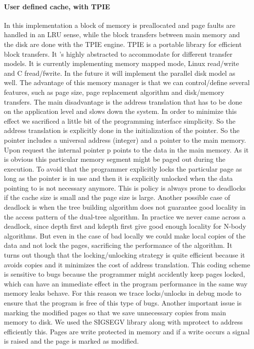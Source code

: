 \documentclass[12pt,letterpaper,doublespaced,ETD,dvips,proposal]{gtthesis}
\begin{document}
\begin{Body}
\paragraph{User defined cache, with TPIE} In this implementation a block of
memory is preallocated and page faults are handled in an LRU sense,
while the block transfers between main memory and the disk are done
with the TPIE engine. TPIE is a portable library for efficient block
transfers. It 's highly abstracted to accommodate for different
transfer models. It is currently implementing memory mapped mode,
Linux read/write and C fread/fwrite. In the future it will implement
the parallel disk model as well. The advantage of this memory
manager is that we can control/define several features, such as page
size, page replacement algorithm and disk/memory transfers. The main
disadvantage is the address translation that has to be done on the
application level and slows down the system. In order to minimize
this effect we sacrificed a little bit of the programming interface
simplicity. So the address translation is explicitly done in the
initialization of the pointer. So the pointer includes a universal
address (integer) and a pointer to the main memory. Upon request the
internal pointer p points to the data in the main memory. As it is
obvious this particular memory segment might be paged out during the
execution. To avoid that the programmer explicitly locks the
particular page as long as the pointer is in use and then it is
explicitly unlocked when the data pointing to is not necessary
anymore. This is  policy is always prone to deadlocks if the cache
size is small and the page size is large. Another possible case of
deadlock is when the tree building algorithm does not guarantee good
locality in the access pattern of the dual-tree algorithm. In
practice we never came across a deadlock, since depth first and
kdepth first give good enough locality for N-body algorithms. But
even in the case of bad locally we could make local copies of the
data and not lock the pages, sacrificing the performance of the
algorithm. It turns out though that the locking/unlocking strategy
is quite efficient because it avoids copies and it minimizes the
cost of address translation. This coding scheme is sensitive to bugs
because the programmer might accidently keep pages locked, which can
have an immediate effect in the program performance in the same way
memory leaks behave. For this reason we trace locks/unlocks in debug
mode to ensure that the program is free of this type of bugs.
Another important issue is marking the modified pages so that we
save unnecessary copies from main memory to disk. We used the
SIGSEGV library along with mprotect to address efficiently this.
Pages are write protected in memory and if a write occurs a signal
is raised and the page is marked as modified.





\end{Body}
\end{document}

